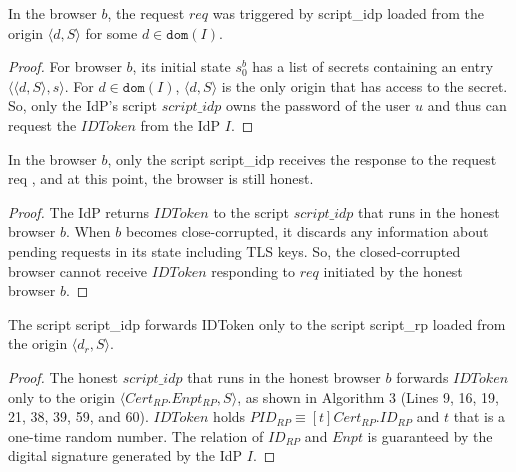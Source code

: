 \begin{lemma}
In the browser $b$, the request $req$ was triggered by script\_idp loaded from the origin $\langle d, S \rangle$ for some $d \in \mathtt{dom}(I)$.
\end{lemma}

\begin{proof}
For browser $b$, its initial state $s^b_0$ has a list of secrets containing an entry $\langle \langle d, S \rangle, s \rangle$. For $d \in \mathtt{dom}(I)$, $\langle d, S \rangle$ is the only origin that has access to the secret. So, only the IdP's script $script\_idp$ owns the password of the user $u$ and thus can request the $IDToken$ from the IdP $I$.
\end{proof}

\begin{lemma}
In the browser $b$, only the script script\_idp receives the response to the request req , and at this point, the browser is still honest.
\end{lemma}

\begin{proof}
The IdP returns $IDToken$ to the script $script\_idp$ that runs in the honest browser $b$. When $b$ becomes close-corrupted, it discards any information about pending requests in its state including TLS keys. So, the closed-corrupted browser cannot receive $IDToken$ responding to $req$ initiated by the honest browser $b$.
\end{proof}

\begin{lemma}
The script script\_idp forwards IDToken only to the script script\_rp loaded from the origin $\langle d_r, S \rangle$.
\end{lemma}

\begin{proof}
The honest $script\_idp$ that runs in the honest browser $b$ forwards $IDToken$ only to the origin $\langle Cert_{RP}.Enpt_{RP}, S \rangle$, as shown in Algorithm 3 %
(Lines 9, 16, 19, 21, 38, 39, 59, and 60). 
$IDToken$ holds $PID_{RP} \equiv [t]Cert_{RP}.ID_{RP}$ and $t$ that is a one-time random number. The relation of $ID_{RP}$ and $Enpt$ is guaranteed by the digital signature generated by the IdP $I$. 
\end{proof}

